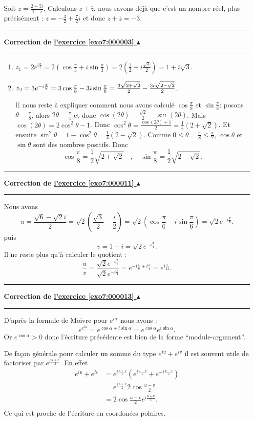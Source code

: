 \documentclass[11pt,a4paper]{article}
\renewcommand{\le}{\leqslant} \renewcommand{\leq}{\leqslant}
\newcounter{exo}
\newcommand{\correction}[1]{\hypertarget{cor7:#1}{}\label{cor7:#1}{\bf Correction de \hyperlink{exo7:#1}{l'exercice \ref{exo7:#1} $\blacktriangle$}}\vspace{1mm}\hrule\vspace{1mm}}
\newcommand{\fincorrection}{\vspace{1mm}\hrule\vspace*{7mm}}
\begin{document}
\bigskip
Soit $z = \frac{2+5i}{1-i}$. Calculons $z + \overline{z}$, nous
savons d\'ej\`a que c'est un nombre r\'eel, plus pr\'ecis\'ement :
$z = -\frac{3}{2}+\frac{7}{2}i$ et donc $ z + \overline{z} = -3$.
\fincorrection
\correction{000003}
\begin{enumerate}
\item $z_1 = 2 e^{i\frac \pi 3} = 2(\cos \frac \pi 3 + i \sin \frac \pi 3) = 2 (\frac 12+ i\frac{\sqrt3}{2}) = 1+i\sqrt 3$.
\item $z_2 = 3e^{-i\frac \pi 8} = 3\cos {\pi \over 8}-3i\sin{\pi \over8}={3\sqrt{2+\sqrt2}\over 2}-{3i\sqrt{2-\sqrt2}\over 2}$.


Il nous reste à expliquer comment nous avons calculé $\cos \frac \pi 8$ et $\sin \frac\pi 8$: 
posons $\theta=\frac{\pi}{8}$,
alors $2\theta = \frac \pi 4$ et donc $\cos(2\theta)= \frac {\sqrt 2}{2} = \sin(2\theta)$.
Mais $\cos(2\theta) = 2\cos^2 \theta - 1$. Donc $\cos^2\theta = \frac{\cos(2\theta) + 1}{2} = \frac 14 (2 + \sqrt 2)$.
Et ensuite  $\sin^2 \theta = 1- \cos^2 \theta = \frac 14 (2 - \sqrt 2)$.
Comme $0 \le \theta = \frac \pi 8 \le \frac \pi 2$, $\cos \theta$ et $\sin \theta$ sont des nombres positifs. Donc
$$\cos \frac \pi 8 = \frac 12 \sqrt{2 + \sqrt 2} \quad, \quad \sin \frac \pi 8 = \frac 12 \sqrt{2 - \sqrt 2}.$$ 

\end{enumerate}
\fincorrection
\correction{000011}
Nous avons
$$ u = \frac{\sqrt{6}-\sqrt{2}i}{2}
= \sqrt{2}\left( \frac{\sqrt{3}}{2}-\frac{i}{2} \right) =
\sqrt{2}\left( \cos\frac{\pi}{6} -i\sin\frac{\pi}{6} \right)
=\sqrt{2} e^{-i\frac{\pi}{6}}.$$ puis
$$v = 1-i = \sqrt{2}e^{-i\frac{\pi}{4}}.$$
Il ne reste plus qu'\`a calculer le quotient :
$$ \frac{u}{v} = \frac{\sqrt{2}e^{-i\frac{\pi}{6}}}{\sqrt{2}e^{-i\frac{\pi}{4}}}
= e^{-i\frac{\pi}{6}+i\frac{\pi}{4}} = e^{i\frac{\pi}{12}}.$$
\fincorrection
\correction{000013}
D'apr\`es la formule de Moivre pour $e^{i\alpha}$ nous avons :
$$e^{e^{i\alpha}} = e^{\cos \alpha + i\sin \alpha}
= e^{\cos \alpha}e^{i\sin \alpha}.$$ Or $e^{\cos \alpha} > 0$ donc
l'\'ecriture pr\'ec\'edente est bien de la forme
``module-argument''.

\bigskip

De fa\c{c}on g\'en\'erale pour calculer un somme du type
$e^{iu}+e^{iv}$ il est souvent utile de factoriser par
$e^{i\frac{u+v}{2}}$. En effet
\begin{align*}
e^{iu}+e^{iv} &= e^{i\frac{u+v}{2}}\left( e^{i
\frac{u-v}{2}}+ e^{-i \frac{u-v}{2}}\right) \\
&= e^{i\frac{u+v}{2}} 2 \cos  \frac{u-v}{2} \\
&=  2 \cos  \frac{u-v}{2} e^{i\frac{u+v}{2}}.\\
\end{align*}
Ce qui est proche de l'\'ecriture en coordon\'ees polaires.
\end{document}
